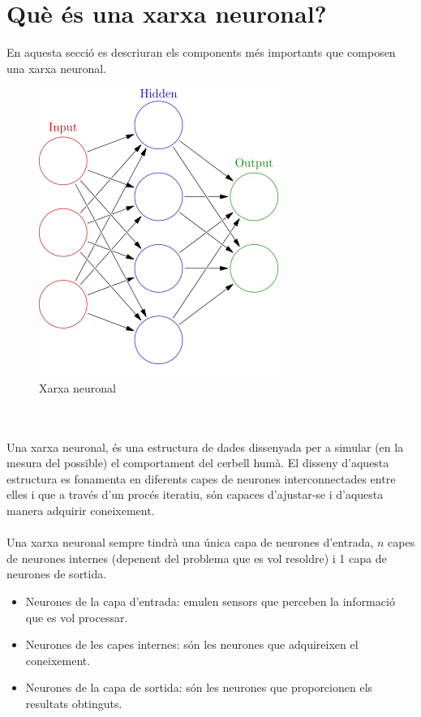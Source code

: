 \documentclass[12pt]{article}
\begin{document}
\section{Què és una xarxa neuronal?}
En aquesta secció es descriuran els components més importants que composen una xarxa neuronal.
\begin{figure}[h!]
	\centering
	\includegraphics[scale=.5]{imatges/xnn.png}
	\caption{Xarxa neuronal}
\end{figure}
\\\\Una xarxa neuronal, és una estructura de dades dissenyada per a simular (en la mesura del possible) el comportament del cerbell humà. El disseny d'aquesta estructura es fonamenta en diferents capes de neurones interconnectades entre elles i que a través d'un procés iteratiu, són capaces d'ajustar-se i d'aquesta manera adquirir coneixement.
\\\\Una xarxa neuronal sempre tindrà una única capa de neurones d'entrada, $n$ capes de neurones internes (depenent del problema que es vol resoldre) i 1 capa de neurones de sortida.
\begin{itemize}
	\item Neurones de la capa d'entrada: emulen sensors que perceben la informació que es vol processar.
	\item Neurones de les capes internes: són les neurones que adquireixen el coneixement.
	\item Neurones de la capa de sortida: són les neurones que proporcionen els resultats obtinguts.
\end{itemize}
\end{document}
